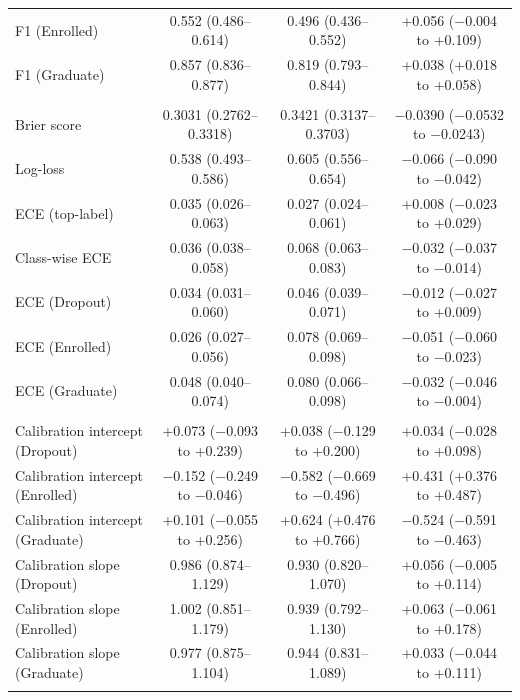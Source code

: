 \begin{table}
\begin{tabular*}{\textwidth}{@{\extracolsep\fill}@{}lccc@{}}
F1 (Enrolled) & 0.552 (0.486--0.614) & 0.496 (0.436--0.552) & +0.056 ($-$0.004 to +0.109) \\
F1 (Graduate) & 0.857 (0.836--0.877) & 0.819 (0.793--0.844) & +0.038 (+0.018 to +0.058) \\
\addlinespace[2pt]
\multicolumn{4}{@{}l}{\textit{Probabilistic accuracy and calibration}} \\
Brier score & 0.3031 (0.2762--0.3318) & 0.3421 (0.3137--0.3703) & $-$0.0390 ($-$0.0532 to $-$0.0243) \\
Log-loss & 0.538 (0.493--0.586) & 0.605 (0.556--0.654) & $-$0.066 ($-$0.090 to $-$0.042) \\
ECE (top-label) & 0.035 (0.026--0.063) & 0.027 (0.024--0.061) & +0.008 ($-$0.023 to +0.029) \\
Class-wise ECE & 0.036 (0.038--0.058) & 0.068 (0.063--0.083) & $-$0.032 ($-$0.037 to $-$0.014) \\
ECE (Dropout) & 0.034 (0.031--0.060) & 0.046 (0.039--0.071) & $-$0.012 ($-$0.027 to +0.009) \\
ECE (Enrolled) & 0.026 (0.027--0.056) & 0.078 (0.069--0.098) & $-$0.051 ($-$0.060 to $-$0.023) \\
ECE (Graduate) & 0.048 (0.040--0.074) & 0.080 (0.066--0.098) & $-$0.032 ($-$0.046 to $-$0.004) \\
\addlinespace[2pt]
\multicolumn{4}{@{}l}{\textit{Weak calibration, one-vs-rest (ideal: intercept 0, slope 1)}} \\
Calibration intercept (Dropout) & +0.073 ($-$0.093 to +0.239) & +0.038 ($-$0.129 to +0.200) & +0.034 ($-$0.028 to +0.098) \\
Calibration intercept (Enrolled) & $-$0.152 ($-$0.249 to $-$0.046) & $-$0.582 ($-$0.669 to $-$0.496) & +0.431 (+0.376 to +0.487) \\
Calibration intercept (Graduate) & +0.101 ($-$0.055 to +0.256) & +0.624 (+0.476 to +0.766) & $-$0.524 ($-$0.591 to $-$0.463) \\
Calibration slope (Dropout) & 0.986 (0.874--1.129) & 0.930 (0.820--1.070) & +0.056 ($-$0.005 to +0.114) \\
Calibration slope (Enrolled) & 1.002 (0.851--1.179) & 0.939 (0.792--1.130) & +0.063 ($-$0.061 to +0.178) \\
Calibration slope (Graduate) & 0.977 (0.875--1.104) & 0.944 (0.831--1.089) & +0.033 ($-$0.044 to +0.111) \\
\botrule
\end{tabular*}
\end{table}

